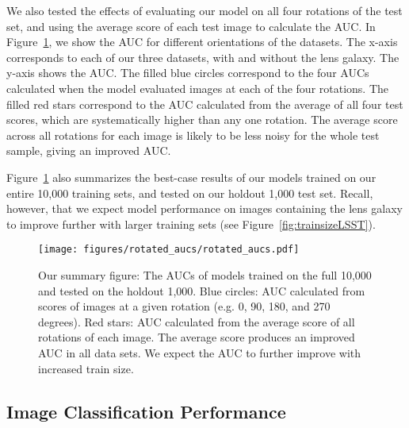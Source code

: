\documentclass{emulateapj}
\begin{document}
We also tested the effects of evaluating our model on all four
rotations of the test set, and using the average score of each test
image to calculate the AUC.  In Figure~\ref{fig:rotation_test}, we
show the AUC for different orientations of the datasets.  The x-axis
corresponds to each of our three datasets, with and without the lens
galaxy.  The y-axis shows the AUC.  The filled blue circles correspond
to the four AUCs calculated when the model evaluated images at each of
the four rotations.  The filled red stars correspond to the AUC
calculated from the average of all four test scores, which are
systematically higher than any one rotation.  The average score across
all rotations for each image is likely to be less noisy for the whole
test sample, giving an improved AUC.

Figure~\ref{fig:rotation_test} also summarizes the best-case results
of our models trained on our entire 10,000 training sets, and tested
on our holdout 1,000 test set.  Recall, however, that we expect model
performance on images containing the lens galaxy to improve further
with larger training sets (see Figure~\ref{fig:trainsizeLSST}).

\begin{figure}[t]
\begin{center}
\texttt{[image: figures/rotated\_aucs/rotated\_aucs.pdf]}
\caption{Our summary figure: The AUCs of models trained on the full
  10,000 and tested on the holdout 1,000.  Blue circles: AUC
  calculated from scores of images at a given rotation (e.g. 0, 90,
  180, and 270 degrees).  Red stars: AUC calculated from the average
  score of all rotations of each image.  The average score produces an
  improved AUC in all data sets.  We expect the AUC to further improve
  with increased train size.}\label{fig:rotation_test}
\end{center}
\end{figure}



\subsection{Image Classification Performance}\label{sec:performance}
\end{document}

